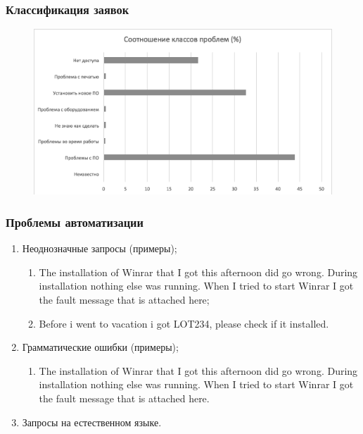 \documentclass[14pt]{beamer}
\begin{document}
\begin{frame}
\frametitle{Классификация заявок}
\begin{figure} [h] 
  \center
  \includegraphics [scale=0.7] {EngineerTasks}
  \label{img:EngineerTasks}  
\end{figure}


\end{frame}


\begin{frame}
\frametitle{Проблемы автоматизации}
\begin{enumerate}
 \item Неоднозначные запросы (примеры);
	\begin{enumerate}
 		\item The installation of Winrar that I got this afternoon did go wrong. During installation nothing else was running. When I tried to start Winrar I got the fault message that is attached here;
 		\item Before i went to vacation i got LOT234, please check if it installed.
	\end{enumerate}
 \item Грамматические ошибки (примеры);
  \begin{enumerate}
 		\item The installation of Winrar that I got this afternoon did go wrong. During installation nothing else was running. When I tried to start Winrar I got the fault message that is attached here.
	\end{enumerate}
	
  \item Запросы на естественном языке.
\end{enumerate}
\end{frame}
\end{document}
